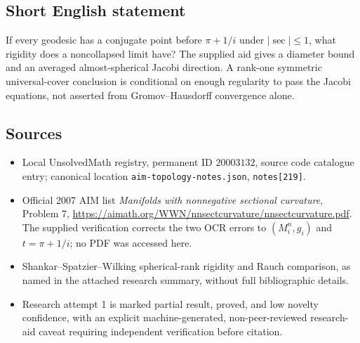 \documentclass[11pt]{article}
\begin{document}
\subsection{Short English statement}
If every geodesic has a conjugate point before $\pi+1/i$ under $|\sec|\leq1$, what rigidity does a noncollapsed limit have? The supplied aid gives a diameter bound and an averaged almost-spherical Jacobi direction. A rank-one symmetric universal-cover conclusion is conditional on enough regularity to pass the Jacobi equations, not asserted from Gromov--Hausdorff convergence alone.
\subsection{Sources}
\begin{itemize}
\item Local UnsolvedMath registry, permanent ID $20003132$, source code catalogue entry; canonical location \texttt{aim-topology-notes.json}, \texttt{notes[219]}.
\item Official 2007 AIM list \emph{Manifolds with nonnegative sectional curvature}, Problem 7, \url{https://aimath.org/WWN/nnsectcurvature/nnsectcurvature.pdf}. The supplied verification corrects the two OCR errors to $(M_i^n,g_i)$ and $t=\pi+1/i$; no PDF was accessed here.
\item Shankar--Spatzier--Wilking spherical-rank rigidity and Rauch comparison, as named in the attached research summary, without full bibliographic details.
\item Research attempt 1 is marked partial result, proved, and low novelty confidence, with an explicit machine-generated, non-peer-reviewed research-aid caveat requiring independent verification before citation.
\end{itemize}
\end{document}
